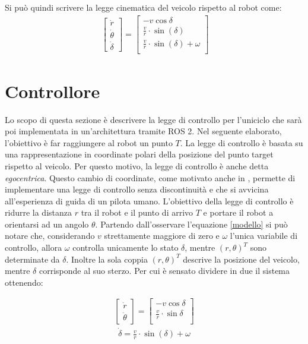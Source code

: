 \documentclass[a4paper,11 pt,oneside]{book}
\theoremstyle{definition}
\begin{document}
Si può quindi scrivere la legge cinematica del veicolo rispetto al robot come:
\begin{align}\
\begin{bmatrix}
  \dot r\\ 
  \dot{\theta}\\
  \dot{\delta}
\end{bmatrix} =
\begin{bmatrix}
  -v \cos\delta\\ 
  \frac{v}{r}\cdot\sin(\delta)\\
  \frac{v}{r}\cdot\sin(\delta) + \omega\\
\end{bmatrix}
\end{align}


\section{Controllore}
Lo scopo di questa sezione è descrivere la legge di controllo per l'uniciclo che sarà poi implementata in un'architettura tramite ROS 2. Nel seguente elaborato, l'obiettivo è far raggiungere al robot un punto $T$. La legge di controllo è basata su una rappresentazione in coordinate polari della posizione del punto target rispetto al veicolo. Per questo motivo, la legge di controllo è anche detta \emph{egocentrica}. Questo cambio di coordinate, come motivato anche in \cite{CONTROLLO:1}, permette di implementare una legge di controllo senza discontinuità e che si avvicina all'esperienza di guida di un pilota umano.
L'obiettivo della legge di controllo è ridurre la distanza $r$ tra il robot e il punto di arrivo $T$ e portare il robot a orientarsi ad un angolo $\theta$.
Partendo dall'osservare l'equazione \eqref{modello} si può notare che, considerando $v$ strettamente maggiore di zero e $\omega$ l'unica variabile di controllo, allora $\omega$ controlla unicamente lo stato $\delta$, mentre $(r,\theta)^{T}$ sono determinate da $\delta$. Inoltre la sola coppia  $(r, \theta)^{T}$ descrive la posizione del veicolo, mentre $\delta$ corrisponde al suo sterzo. Per cui è sensato  dividere in due il sistema ottenendo:

\begin{align}
\begin{bmatrix}
  \dot r\\ 
  \dot{\theta}
\end{bmatrix}
 =
\begin{bmatrix}
  -v \cos\delta\\ 
  \frac{v}{r}\cdot\sin\delta\\
\end{bmatrix}
\end{align}
\begin{align}
\dot{\delta} = \frac{v}{r}\cdot\sin(\delta) + \omega
\end{align}
\vspace{1mm}
\end{document}
